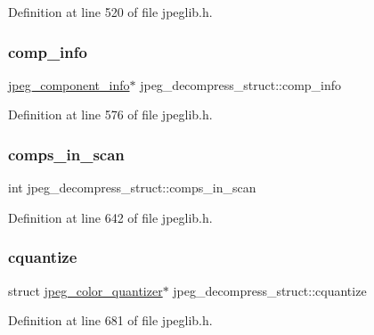 Definition at line 520 of file jpeglib.\+h.

\mbox{\label{structjpeg__decompress__struct_afb7ab593b5699842965eccb64e6e200a}} 
\subsubsection{\texorpdfstring{comp\_info}{comp\_info}}
{\footnotesize\ttfamily \mbox{\hyperlink{structjpeg__component__info}{jpeg\+\_\+component\+\_\+info}}$\ast$ jpeg\+\_\+decompress\+\_\+struct\+::comp\+\_\+info}



Definition at line 576 of file jpeglib.\+h.

\mbox{\label{structjpeg__decompress__struct_a2a28db865b9d49bfa9bc6335abf331c3}} 
\subsubsection{\texorpdfstring{comps\_in\_scan}{comps\_in\_scan}}
{\footnotesize\ttfamily int jpeg\+\_\+decompress\+\_\+struct\+::comps\+\_\+in\+\_\+scan}



Definition at line 642 of file jpeglib.\+h.

\mbox{\label{structjpeg__decompress__struct_ace3f4f51b8cf7bd24428ae9d10f5ddf1}} 
\subsubsection{\texorpdfstring{cquantize}{cquantize}}
{\footnotesize\ttfamily struct \mbox{\hyperlink{structjpeg__color__quantizer}{jpeg\+\_\+color\+\_\+quantizer}}$\ast$ jpeg\+\_\+decompress\+\_\+struct\+::cquantize}



Definition at line 681 of file jpeglib.\+h.


